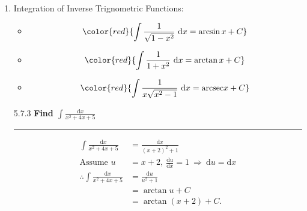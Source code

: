 \documentclass[12pt, a4paper]{article}
\begin{document}
\begin{enumerate}
\begin{example}{5.7.2}{}
        Assume $u=x^2+3$, then $\frac{\mathrm{d}u}{\mathrm{d}x}=(x^2+3)'=2x\ \Rightarrow\ \mathrm{d}u=2x\cdot \mathrm{d}x.$
        $$\begin{aligned}
            \therefore\int 2x(x^2+3)^5\ \mathrm{d}x&=\int (x^2+3)^5\cdot (2x\cdot\mathrm{d}x)\\
            &=\int u^5\ \mathrm{d}u\\
            &=\frac{1}{6}u^6+C\\
            &=\frac{1}{6}(x^2+3)^6+C.
        \end{aligned}$$
    \end{example}
    \item Integration of Inverse Trignometric Functions: 
    \begin{itemize}
        \item $${\color{red}{\int \frac{1}{\sqrt{1-x^2}}\ \mathrm{d}x=\arcsin x+C}}$$
        \item $${\color{red}{\int \frac{1}{1+x^2}\ \mathrm{d}x=\arctan x+C}}$$
        \item $${\color{red}{\int \frac{1}{x\sqrt{x^2-1}}\ \mathrm{d}x=\text{arcsec} x+C}}$$
    \end{itemize}
    \begin{example}{5.7.3}{}
        \textbf{Find $\int \frac{\mathrm{d}x}{x^2+4x+5}$}\\
        \noindent\rule[0.1pt]{\textwidth}{1pt}
        $$\begin{aligned}
            \int \frac{\mathrm{d}x}{x^2+4x+5}&=\frac{\mathrm{d}x}{(x+2)^2+1}\\
            \text{Assume }u&=x+2,\ \frac{\mathrm{d}u}{\mathrm{d}x}=1\ \Rightarrow\ \mathrm{d}u=\mathrm{d}x\\
            \therefore  \int \frac{\mathrm{d}x}{x^2+4x+5}&=\frac{\mathrm{d}u}{u^2+1}\\
            &=\arctan u+C\\
            &=\arctan (x+2)+C.
        \end{aligned}$$
    \end{example}
\end{enumerate}
\end{document}

